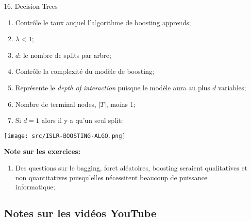 \documentclass[12pt, titlepage, french]{report}
\begin{document}
\begin{CHPT_SUMM}[label = {DECISION-TREES}]{16. Decision Trees}
\begin{enumerate}
\begin{enumerate}
		\item[]	Contrôle le taux auquel l'algorithme de boosting apprends;
		\item[]	$\lambda < 1$;
		\item	$d$: le nombre de splits par arbre;
		\item[]	Contrôle la complexité du modèle de boosting;
		\item[]	Représente le \textit{depth of interaction} puisque le modèle aura au plus $d$ variables;
		\item[]	Nombre de terminal nodes, $|T|$, moins 1;
		\item[]	Si $d = 1$ alors il y a qu'un seul split;
		\end{enumerate}
	
	\texttt{[image: src/ISLR-BOOSTING-ALGO.png]}
\end{enumerate}
\textbf{Note sur les exercices:} 
	\begin{enumerate}
	\item	Des questions sur le bagging, foret aléatoires, boosting seraient qualitatives et non quantitatives puisqu'elles nécessitent beaucoup de puissance informatique;
	\end{enumerate}
\end{CHPT_SUMM}

\subsection{Notes sur les vidéos YouTube}
\end{document}
